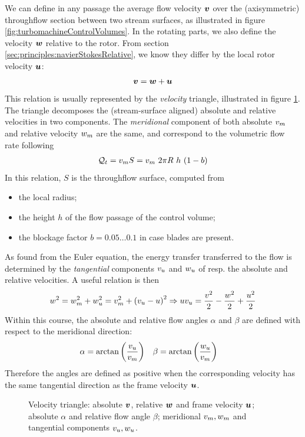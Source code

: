 We can define in any passage the average flow velocity $\boldsymbol {v}$ over
the (axisymmetric) throughflow section between two stream surfaces, as
illustrated in figure \ref{fig:turbomachineControlVolumes}. In the
rotating parts, we also define the velocity $\boldsymbol {w}$ relative to the
rotor. From section \ref{sec:principles:navierStokesRelative}, we know they
differ by the local rotor velocity $\boldsymbol {u}$:
\begin{align*}
  \boldsymbol {v} = \boldsymbol {w} + \boldsymbol {u}
\end{align*}
This relation is usually represented by the \emph{velocity} triangle,
illustrated in figure \ref{fig:velocityTriangle}. The triangle
decomposes the (stream-surface aligned) absolute and relative
velocities in two components. The \emph{meridional} component of both
absolute $v_m$ and relative velocity $w_m$ are the same, and
correspond to the volumetric flow rate following
\begin{align*}
  \mathcal Q_t = v_m S = v_m ~ 2 \pi R ~ h ~ (1-b)
\end{align*}
In this relation, $S$ is the throughflow surface, computed from
\begin{itemize}
\item the local radius;
\item the height $h$ of the flow passage of the control volume;
\item the blockage factor $b = 0.05 \ldots 0.1$ in case blades are
  present.
\end{itemize}
As found from the Euler equation, the energy transfer transferred to
the flow is determined by the \emph{tangential} components $v_u$
and $w_u$ of resp. the absolute and relative velocities. A useful
relation is then
\begin{align}
  w^2 
  = w_m^2 + w_u^2 
  = v_m^2 + \left(v_u - u\right)^2 
  \Rightarrow u v_u = \frac{v^2}{2} - \frac{w^2}{2} + \frac{u^2}{2}
\end{align}
Within this course, the absolute and relative flow angles $\alpha$ and
$\beta$ are defined with respect to the meridional direction:
\begin{align*}
  \alpha &= \arctan \left(\frac{v_u}{v_m} \right) &
  \beta &= \arctan \left(\frac{w_u}{v_m} \right)
\end{align*}
Therefore the angles are defined as positive when the corresponding
velocity has the same tangential direction as the frame velocity
$\boldsymbol {u}$.
\begin{figure}[!h]
  \centering{}
  \caption{Velocity triangle: absolute $\boldsymbol {v}$, relative $\boldsymbol {w}$ and
    frame velocity $\boldsymbol {u}$; absolute $\alpha$ and relative flow angle
    $\beta$; meridional $v_m,w_m$ and tangential components
    $v_u,w_u$.}
  \label{fig:velocityTriangle}
\end{figure}


